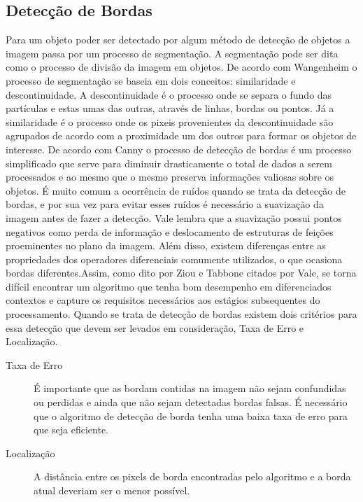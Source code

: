 \subsection{Detecção de Bordas}
Para um objeto poder ser detectado por algum método de detecção de objetos a imagem passa por um processo de segmentação. A segmentação pode ser dita como o processo de divisão da imagem em objetos\cite{Gonzalez:2008}. De acordo com Wangenheim\cite{Wangenheim:2014} o processo de segmentação se baseia em dois conceitos: similaridade e descontinuidade. A descontinuidade é o processo onde se separa o fundo das partículas e estas umas das outras, através de linhas, bordas ou pontos. Já a similaridade é o processo onde os pixeis provenientes da descontinuidade são agrupados de acordo com a proximidade um dos outros para formar os objetos de interesse. De acordo com Canny\cite{Canny:1986} o processo de detecção de bordas é um processo simplificado que serve para diminuir drasticamente o total de dados a serem processados e ao mesmo que o mesmo preserva informações valiosas sobre os objetos. É muito comum a ocorrência de ruídos quando se trata da detecção de bordas, e por sua vez para evitar esses ruídos é necessário a suavização da imagem antes de fazer a detecção. Vale\cite{Vale:2002} lembra que a suavização possui pontos negativos como perda de informação e deslocamento de estruturas de feições proeminentes no plano da imagem. Além disso, existem diferenças entre as propriedades dos operadores diferenciais comumente utilizados, o que ocasiona  bordas diferentes.Assim, como dito por Ziou e Tabbone citados por Vale\cite{Vale:2002}, se torna difícil encontrar um algoritmo que tenha bom desempenho em diferenciados contextos e capture os requisitos necessários aos estágios subsequentes do processamento. 
Quando se trata de detecção de bordas existem dois critérios\cite{Canny:1986} para essa detecção que devem ser levados em consideração, Taxa de Erro e Localização\cite{Vale:2002}. 
\begin{description}
	\item[Taxa de Erro] É importante que as bordam contidas na imagem não sejam confundidas ou perdidas e ainda que não sejam detectadas bordas falsas. É necessário que o algoritmo de detecção de borda tenha uma baixa taxa de erro para que seja eficiente.\cite{Wangenheim:2014, Canny:1986, Vale:2002}
	\item[Localização] A distância entre os pixels de borda encontradas pelo algoritmo e a borda atual deveriam ser o menor possível.\cite{Wangenheim:2014}
\end{description}
